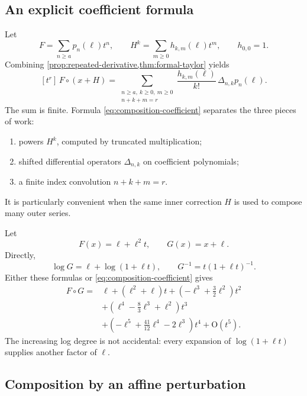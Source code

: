 \documentclass[11pt,oneside]{article}
\numberwithin{equation}{section}
\theoremstyle{definition}
\newcommand{\bigO}{\mathrm{O}}
\newcommand{\coeff}[2]{[#1]\,#2}
\begin{document}
\subsection{An explicit coefficient formula}

Let
\begin{equation}\label{eq:F-H-components}
 F=\sum_{n\ge a}p_n(\ell)t^n,
 \qquad
 H^k=\sum_{m\ge0}h_{k,m}(\ell)t^m,
 \qquad h_{0,0}=1.
\end{equation}
Combining \cref{prop:repeated-derivative,thm:formal-taylor} yields
\begin{equation}\label{eq:composition-coefficient}
\boxed{
  \coeff{t^r}{F\circ(x+H)}
  =\sum_{\substack{n\ge a,\ k\ge0,\ m\ge0\\n+k+m=r}}
    \frac{h_{k,m}(\ell)}{k!}\,\Delta_{n,k}p_n(\ell).
}
\end{equation}
The sum is finite.  Formula \eqref{eq:composition-coefficient} separates the
three pieces of work:
\begin{enumerate}
\item powers \(H^k\), computed by truncated multiplication;
\item shifted differential operators \(\Delta_{n,k}\) on coefficient
  polynomials;
\item a finite index convolution \(n+k+m=r\).
\end{enumerate}
It is particularly convenient when the same inner correction \(H\) is used to
compose many outer series.

\begin{examplebox}
Let
\[
  F(x)=\ell+\ell^2t,
  \qquad G(x)=x+\ell.
\]
Directly,
\[
  \log G=\ell+\log(1+\ell t),
  \qquad G^{-1}=t(1+\ell t)^{-1}.
\]
Either these formulas or \eqref{eq:composition-coefficient} gives
\begin{align*}
 F\circ G={}&\ell+(\ell^2+\ell)t
 +\left(-\ell^3+\frac32\ell^2\right)t^2\\
 &+\left(\ell^4-\frac83\ell^3+\ell^2\right)t^3\\
 &+\left(-\ell^5+\frac{41}{12}\ell^4-2\ell^3\right)t^4
 +\bigO(t^5).
\end{align*}
The increasing log degree is not accidental: every expansion of
\(\log(1+\ell t)\) supplies another factor of \(\ell\).
\end{examplebox}

\subsection{Composition by an affine perturbation}
\end{document}
